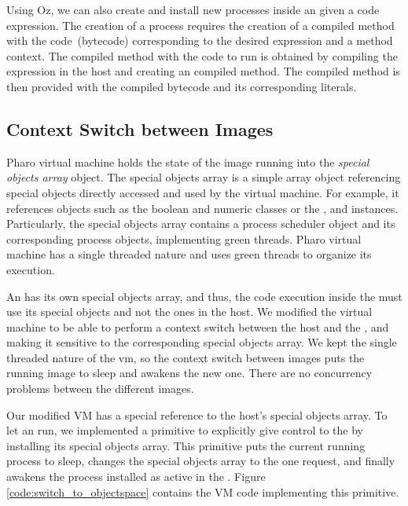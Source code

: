 Using Oz, we can also create and install new processes inside an \objectspace given a code expression. The creation of a process requires the creation of a compiled method with the code~(bytecode) corresponding to the desired expression and a method context. The compiled method with the code to run is obtained by compiling the expression in the host and creating an \objectspace compiled method. The \objectspace compiled method is then provided with the compiled bytecode and its corresponding literals.

\subsection{Context Switch between Images} \label{sec:context_switch}

Pharo virtual machine holds the state of the image running into the \emph{special objects array} object. The special objects array is a simple array object referencing special objects directly accessed and used by the virtual machine. For example, it references objects such as the boolean and numeric classes or the ,  and  instances. Particularly, the special objects array contains a process scheduler object and its corresponding process objects, implementing green threads. Pharo virtual machine has a single threaded nature and uses green threads to organize its execution.

An \objectspace has its own special objects array, and thus, the code execution inside the \objectspace must use its special objects and not the ones in the host. We modified the virtual machine to be able to perform a context switch between the host and the \objectspace, and making it sensitive to the corresponding special objects array. We kept the single threaded nature of the vm, so the context switch between images puts the running image to sleep and awakens the new one. There are no concurrency problems between the different images.

Our modified VM has a special reference to the host's special objects array. To let an \objectspace run, we implemented a primitive to explicitly give control to the \objectspace by installing its special objects array. This primitive puts the current running process to sleep, changes the special objects array to the one request, and finally awakens the process installed as active in the \objectspace. Figure \ref{code:switch_to_objectspace} contains the VM code implementing this primitive.

